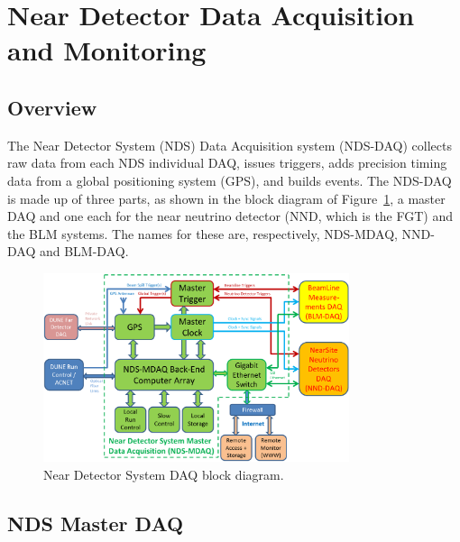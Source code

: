 \section{Near Detector Data Acquisition and Monitoring}
\label{sec:daq-nd}

\subsection{Overview}
The Near Detector System (NDS) Data Acquisition system (NDS-DAQ)
collects raw data from each NDS individual DAQ, issues
triggers, adds precision timing data from a global positioning system
(GPS), and builds events.  The NDS-DAQ is made up of three parts, as
shown in the block diagram of Figure~\ref{fig:nds-daq-block}, a master DAQ
and one each for the near neutrino detector (NND, which is the FGT)
and the BLM systems. The names for these are, respectively, NDS-MDAQ,
NND-DAQ and BLM-DAQ.

\begin{figure}[h!]
\centering
\includegraphics[width=0.8\textwidth]{daq-nd-block-diagram.png}
\caption{Near Detector System DAQ block diagram.}
\label{fig:nds-daq-block}
\end{figure}


\subsection{NDS Master DAQ} 
\label{cdrsec:nd-master-daq}

